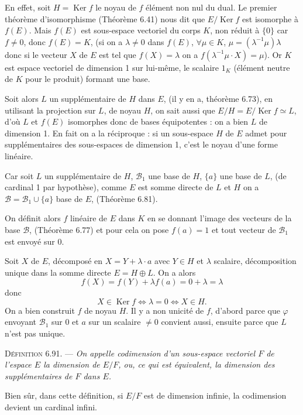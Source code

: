 En effet, soit $H=\operatorname{Ker} f$ le noyau de $f$ élément non nul du dual. Le premier théorème d'isomorphisme (Théorème 6.41) nous dit que $E/\operatorname{Ker} f$ est isomorphe à $f(E)$. Mais $f(E)$ est sous-espace vectoriel du corps $K$, non réduit à $\{0\}$ car $f\ne0$, donc $f(E)=K$, (si on a $\lambda\ne0$ dans $f(E)$, $\forall\mu\in K$, $\mu=(\lambda^{-1}\mu)\lambda$ donc si le vecteur $X$ de $E$ est tel que $f(X)=\lambda$ on a $f(\lambda^{-1}\mu\cdot X)=\mu$). Or $K$ est espace vectoriel de dimension 1 sur lui-même, le scalaire $1_K$ (élément neutre de $K$ pour le produit) formant une base.

Soit alors $L$ un supplémentaire de $H$ dans $E$, (il y en a, théorème 6.73), en utilisant la projection sur $L$, de noyau $H$, on sait aussi que $E/H=E/\operatorname{Ker} f\simeq L$, d'où $L$ et $f(E)$ isomorphes donc de bases équipotentes : on a bien $L$ de dimension 1. En fait on a la réciproque : si un sous-espace $H$ de $E$ admet pour supplémentaires des sous-espaces de dimension 1, c'est le noyau d'une forme linéaire.

Car soit $L$ un supplémentaire de $H$, $\mathcal B_1$ une base de $H$, $\{a\}$ une base de $L$, (de cardinal 1 par hypothèse), comme $E$ est somme directe de $L$ et $H$ on a $\mathcal B=\mathcal B_1\cup\{a\}$ base de $E$, (Théorème 6.81).

On définit alors $f$ linéaire de $E$ dans $K$ en se donnant l'image des vecteurs de la base $\mathcal B$, (Théorème 6.77) et pour cela on pose $f(a)=1$ et tout vecteur de $\mathcal B_1$ est envoyé sur 0.

Soit $X$ de $E$, décomposé en $X=Y+\lambda\cdot a$ avec $Y\in H$ et $\lambda$ scalaire, décomposition unique dans la somme directe $E=H\oplus L$. On a alors
\[
f(X)=f(Y)+\lambda f(a)=0+\lambda=\lambda
\]
donc
\[
X\in\operatorname{Ker} f\Longleftrightarrow\lambda=0\Longleftrightarrow X\in H.
\]
On a bien construit $f$ de noyau $H$. Il y a non unicité de $f$, d'abord parce que $\varphi$ envoyant $\mathcal B_1$ sur 0 et $a$ sur un scalaire $\ne0$ convient aussi, ensuite parce que $L$ n'est pas unique. \bookend

\medskip\noindent\textsc{Définition 6.91.} --- \emph{On appelle codimension d'un sous-espace vectoriel $F$ de l'espace $E$ la dimension de $E/F$, ou, ce qui est équivalent, la dimension des supplémentaires de $F$ dans $E$.}

Bien sûr, dans cette définition, si $E/F$ est de dimension infinie, la codimension devient un cardinal infini.

